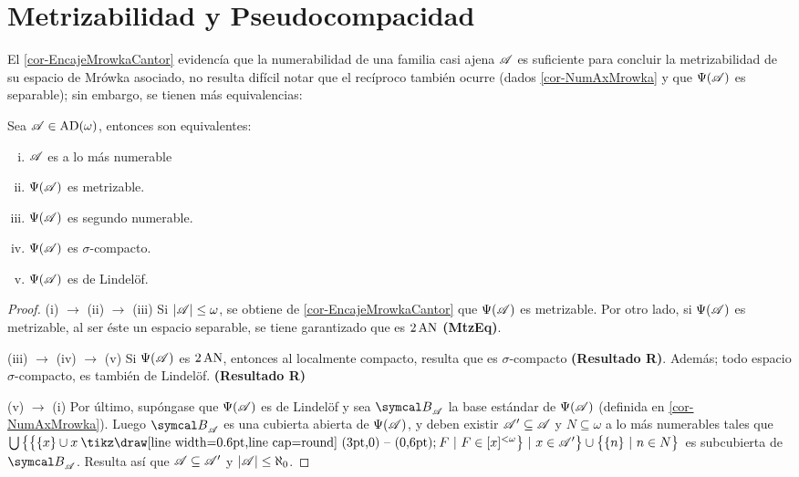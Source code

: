 \section{Metrizabilidad y Pseudocompacidad}

El \autoref{cor-EncajeMrowkaCantor} evidencía que la numerabilidad de una familia casi ajena $\mathscr{A}$ es suficiente para concluir la metrizabilidad de su espacio de Mrówka asociado, no resulta difícil notar que el recíproco también ocurre (dados \ref{cor-NumAxMrowka} y que $\Psi(\mathscr{A})$ es separable); sin embargo, se tienen más equivalencias:

\begin{proposicion}\label{prop-tra-numerable}
	Sea $\mathscr{A}\in \operatorname{AD}(\omega)$, entonces son equivalentes:
	\begin{enumerate}[i)]
		\item $\mathscr{A}$ es a lo más numerable
		\item $\Psi(\mathscr{A})$ es metrizable.
		\item $\Psi(\mathscr{A})$ es segundo numerable.
		\item $\Psi(\mathscr{A})$ es $\sigma$-compacto.
		\item $\Psi(\mathscr{A})$ es de Lindelöf.
	\end{enumerate}
\end{proposicion}

\begin{proof}
	(i) $\rightarrow$ (ii) $\rightarrow$ (iii) Si $|\mathscr{A}| \leq \omega$, se obtiene de \ref{cor-EncajeMrowkaCantor} que $\Psi(\mathscr{A})$ es metrizable. Por otro lado, si $\Psi(\mathscr{A})$ es metrizable, al ser éste un espacio separable, se tiene garantizado que es $2\operatorname{AN}$ \textbf{(MtzEq)}.

	(iii) $\rightarrow$ (iv) $\to$ (v) Si $\Psi(\mathscr{A})$ es $2\operatorname{AN}$, entonces al localmente compacto, resulta que es $\sigma$-compacto \textbf{(Resultado R)}. Además; todo espacio $\sigma$-compacto, es también de Lindelöf. \textbf{(Resultado R)}

	(v) $\rightarrow$ (i) Por último, supóngase que $\Psi(\mathscr{A})$ es de Lindelöf y sea $\mathcal{B}_\ms{A}$ la base estándar de $\Psi(\mathscr{A})$ (definida en \ref{cor-NumAxMrowka}). Luego $\mathcal{B}_ \ms{A}$ es una cubierta abierta de $\Psi(\mathscr{A})$, y deben existir $\mathscr{A}' \subseteq \mathscr{A}$ y $N \subseteq \omega$ a lo más numerables tales que $\midcup \big\{ \big\{ \{x\} \cup x \setminus F \tq F \in [x]^{<\omega} \big\} \tq x \in \ms{A}' \big\} \cup \big\{ \{n\} \tq n \in N \big\}$ es subcubierta de $\mathcal{B}_ \ms{A}$. Resulta así que $\mathscr{A} \subseteq \mathscr{A}'$ y $|\mathscr{A}| \leq \aleph_0$.
\end{proof}

